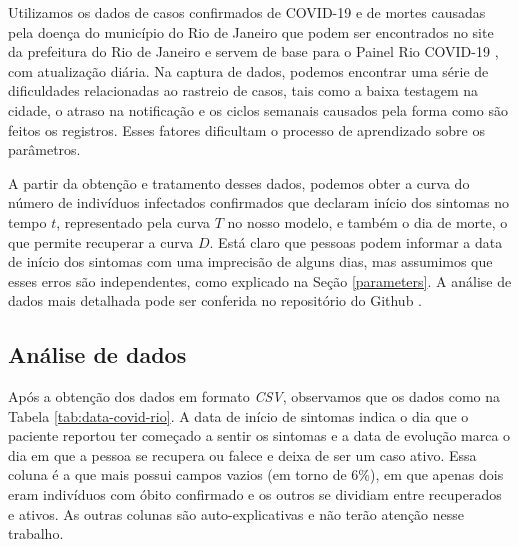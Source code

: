 Utilizamos os dados de casos confirmados de COVID-19 e de mortes causadas pela doença do município do Rio de Janeiro que podem ser encontrados no site da prefeitura do Rio de Janeiro \cite{data-rio-covid} e servem de base para o Painel Rio COVID-19 \cite{painel-rio-covid}, com atualização diária. 
Na captura de dados, podemos encontrar uma série de dificuldades relacionadas ao rastreio de casos, tais como a baixa testagem na cidade, o atraso na notificação e os ciclos semanais causados pela forma como são feitos os registros. 
Esses fatores dificultam o processo de aprendizado sobre os parâmetros. 

A partir da obtenção e tratamento desses dados, podemos obter a curva do número de indivíduos infectados confirmados que declaram início dos sintomas no tempo $t$, representado pela curva $T$ no nosso modelo, e também o dia de morte, o que permite recuperar a curva $D$. 
Está claro que pessoas podem informar a data de início dos sintomas com uma imprecisão de alguns dias, mas assumimos que esses erros são independentes, como explicado na Seção \ref{parameters}. 
A análise de dados mais detalhada pode ser conferida no repositório do Github \cite{github}.

\subsection{Análise de dados}
\label{data-analysis}

Após a obtenção dos dados em formato {\it CSV}, observamos que os dados como na Tabela \ref{tab:data-covid-rio}. 
A data de início de sintomas indica o dia que o paciente reportou ter começado a sentir os sintomas e a data de evolução marca o dia em que a pessoa se recupera ou falece e deixa de ser um caso ativo. Essa coluna é a que mais possui campos vazios (em torno de 6\%), em que apenas dois eram indivíduos com óbito confirmado e os outros se dividiam entre recuperados e ativos. 
As outras colunas são auto-explicativas e não terão atenção nesse trabalho.

